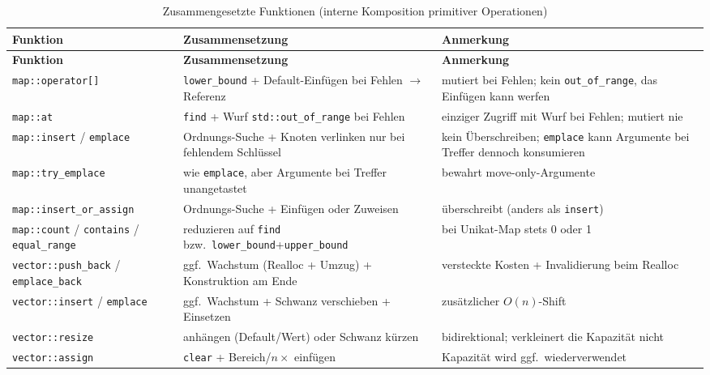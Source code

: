 \begin{longtable}{@{}>{\raggedright\arraybackslash}p{3.3cm} >{\raggedright\arraybackslash}p{5.6cm} >{\raggedright\arraybackslash}p{3.1cm}@{}}
  \caption{Zusammengesetzte Funktionen (interne Komposition primitiver Operationen)}\label{tab:if-decomp}\\
  \toprule
  \textbf{Funktion} & \textbf{Zusammensetzung} & \textbf{Anmerkung} \\
  \midrule
\endfirsthead%
  \toprule
  \textbf{Funktion} & \textbf{Zusammensetzung} & \textbf{Anmerkung} \\
  \midrule
\endhead%
  \texttt{map::}\allowbreak\texttt{operator[]} & \texttt{lower\_bound} + Default-Einfügen bei Fehlen $\to$ Referenz & mutiert bei Fehlen; kein \texttt{out\_of\_range}, das Einfügen kann werfen \\
  \texttt{map::at} & \texttt{find} + Wurf \texttt{std::out\_of\_range} bei Fehlen & einziger Zugriff mit Wurf bei Fehlen; mutiert nie \\
  \texttt{map::insert} / \texttt{emplace} & Ordnungs-Suche + Knoten verlinken nur bei fehlendem Schlüssel & kein Überschreiben; \texttt{emplace} kann Argumente bei Treffer dennoch konsumieren \\
  \texttt{map::try\_\allowbreak{}emplace} & wie \texttt{emplace}, aber Argumente bei Treffer unangetastet & bewahrt move-only-Argumente \\
  \texttt{map::insert\_\allowbreak{}or\_\allowbreak{}assign} & Ordnungs-Suche + Einfügen oder Zuweisen & überschreibt (anders als \texttt{insert}) \\
  \texttt{map::count} / \texttt{contains} / \texttt{equal\_range} & reduzieren auf \texttt{find} bzw.\ \texttt{lower\_bound}+\texttt{upper\_bound} & bei Unikat-Map stets 0 oder 1 \\
  \texttt{vector::}\allowbreak\texttt{push\_back} / \texttt{emplace\_back} & ggf.\ Wachstum (Realloc + Umzug) + Konstruktion am Ende & versteckte Kosten + Invalidierung beim Realloc \\
  \texttt{vector::insert} / \texttt{emplace} & ggf.\ Wachstum + Schwanz verschieben + Einsetzen & zusätzlicher $O(n)$-Shift \\
  \texttt{vector::resize} & anhängen (Default/Wert) oder Schwanz kürzen & bidirektional; verkleinert die Kapazität nicht \\
  \texttt{vector::assign} & \texttt{clear} + Bereich/$n\times$ einfügen & Kapazität wird ggf.\ wiederverwendet \\
  \bottomrule
\end{longtable}

